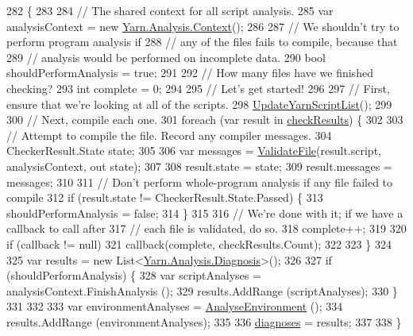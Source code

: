 \begin{DoxyCode}
282         \{
283 
284             \textcolor{comment}{// The shared context for all script analysis.}
285             var analysisContext = \textcolor{keyword}{new} \hyperlink{a00056}{Yarn.Analysis.Context}();
286 
287             \textcolor{comment}{// We shouldn't try to perform program analysis if}
288             \textcolor{comment}{// any of the files fails to compile, because that}
289             \textcolor{comment}{// analysis would be performed on incomplete data.}
290             \textcolor{keywordtype}{bool} shouldPerformAnalysis = \textcolor{keyword}{true};
291 
292             \textcolor{comment}{// How many files have we finished checking?}
293             \textcolor{keywordtype}{int} complete = 0;
294 
295             \textcolor{comment}{// Let's get started!}
296 
297             \textcolor{comment}{// First, ensure that we're looking at all of the scripts.}
298             \hyperlink{a00166_a406febf62d77eaabc235f6316e537345}{UpdateYarnScriptList}();
299 
300             \textcolor{comment}{// Next, compile each one.}
301             \textcolor{keywordflow}{foreach} (var result \textcolor{keywordflow}{in} \hyperlink{a00166_aa85ab7bd194e5425b991b9c216d4d10e}{checkResults}) \{
302 
303                 \textcolor{comment}{// Attempt to compile the file. Record any compiler messages.}
304                 CheckerResult.State state;
305 
306                 var messages = \hyperlink{a00166_a6f2bf42b228ea29c6477e369226db8b6}{ValidateFile}(result.script, analysisContext, out state);
307 
308                 result.state = state;
309                 result.messages = messages;
310 
311                 \textcolor{comment}{// Don't perform whole-program analysis if any file failed to compile}
312                 \textcolor{keywordflow}{if} (result.state != CheckerResult.State.Passed) \{
313                     shouldPerformAnalysis = \textcolor{keyword}{false};
314                 \}
315 
316                 \textcolor{comment}{// We're done with it; if we have a callback to call after}
317                 \textcolor{comment}{// each file is validated, do so.}
318                 complete++;
319 
320                 \textcolor{keywordflow}{if} (callback != null)
321                     callback(complete, checkResults.Count);
322 
323             \}
324 
325             var results = \textcolor{keyword}{new} List<\hyperlink{a00089}{Yarn.Analysis.Diagnosis}>();
326 
327             \textcolor{keywordflow}{if} (shouldPerformAnalysis) \{
328                 var scriptAnalyses = analysisContext.FinishAnalysis ();
329                 results.AddRange (scriptAnalyses);
330             \}
331 
332 
333             var environmentAnalyses = \hyperlink{a00166_a9c207786c349120dc439bdce53072191}{AnalyseEnvironment} ();
334             results.AddRange (environmentAnalyses);
335 
336             \hyperlink{a00166_a25c92cbfdd09661a96714d05b14af886}{diagnoses} = results;
337 
338         \}
\end{DoxyCode}
